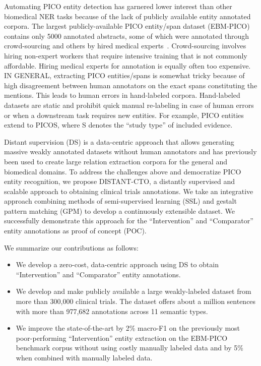 \documentclass[11pt]{article}
\begin{document}
Automating PICO entity detection has garnered lower interest than other biomedical NER tasks because of the lack of publicly available entity annotated corpora.
The largest publicly-available PICO entity/span dataset (EBM-PICO) contains only 5000 annotated abstracts, some of which were annotated through crowd-sourcing and others by hired medical experts~\cite{nye2018corpus}.
Crowd-sourcing involves hiring non-expert workers that require intensive training that is not commonly affordable.
Hiring medical experts for annotation is equally often too expensive.
IN GENERAL, extracting PICO entities/spans is somewhat tricky because of high disagreement between human annotators on the exact spans constituting the mentions.
This leads to human errors in hand-labeled corpora.
Hand-labeled datasets are static and prohibit quick manual re-labeling in case of human errors or when a downstream task requires new entities.
For example, PICO entities extend to PICOS, where S denotes the ``study type'' of included evidence.

Distant supervision (DS) is a data-centric approach that allows generating massive weakly annotated datasets without human annotators and has previously been used to create large relation extraction corpora for the general and biomedical domains.
To address the challenges above and democratize PICO entity recognition, we propose DISTANT-CTO, a distantly supervised and scalable approach to obtaining clinical trials annotations.
We take an integrative approach combining methods of semi-supervised learning (SSL) and gestalt pattern matching (GPM) to develop a continuously extensible dataset.
We successfully demonstrate this approach for the ``Intervention'' and ``Comparator'' entity annotations as proof of concept (POC).


We summarize our contributions as follows:
%
\begin{itemize}
    \item We develop a zero-cost, data-centric approach using DS to obtain ``Intervention'' and ``Comparator'' entity annotations.
    \item We develop and make publicly available a large weakly-labeled dataset from more than 300,000 clinical trials. The dataset offers about a million sentences with more than 977,682 annotations across 11 semantic types.
    \item We improve the state-of-the-art by 2\% macro-F1 on the previously most poor-performing ``Intervention'' entity extraction on the EBM-PICO benchmark corpus without using costly manually labeled data and by 5\% when combined with manually labeled data.
\end{itemize}
%
%
%
\end{document}
